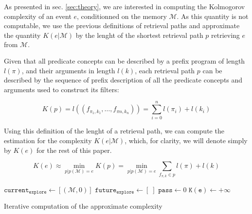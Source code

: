 \documentclass[conference]{IEEEtran}
\begin{document}
As presented in sec. \ref{sec:theory}, we are interested in computing the
Kolmogorov complexity of an event $e$, conditionned on the memory $\mathcal{M}$.
As this quantity is not computable, we use the previous definitions of retrieval
paths and approximate the quantity $K(e|\mathcal{M})$ by the lenght of the
shortest retrieval path $p$ retrieving $e$ from $\mathcal{M}$.

Given that all predicate concepts can be described by a prefix program of length
$l(\pi)$, and their arguments in length $l(k)$, each retrieval path $p$ can be
described by the sequence of prefix description of all the predicate concepts and
arguments used to construct its filters:

\begin{equation}
K(p) = l((f_{\pi_{1}, k_{1}}, \dots, f_{\pi{n}, k_{n}})) = \sum_{i=0}^{n} l(\pi_{i}) + l(k_{i})
\end{equation}

Using this definition of the lenght of a retrieval path, we can compute the
estimation for the complexity $K(e|\mathcal{M})$, which, for clarity, we will
denote simply by $K(e)$ for the rest of this paper.

\begin{equation}
  \label{eq:desc_k}
  K(e) \approx \min_{p | p(\mathcal{M}) = e} K(p) = \min_{p | p(\mathcal{M})=e} \sum_{f_{\pi, k} \in p} l(\pi) + l(k)
\end{equation}

\begin{algorithm}
  $\mathtt{current_{explore}} \leftarrow [(\mathcal{M}, 0)]$ \;
  $\mathtt{future_{explore} \leftarrow} [\;]$ \;
  $\mathtt{pass} \leftarrow 0$ \;
  $\mathtt{K(e)} \leftarrow +\infty$ \;
  \caption{Iterative computation of the approximate complexity}
  \label{alg:complex_iter}
\end{algorithm}
\end{document}
